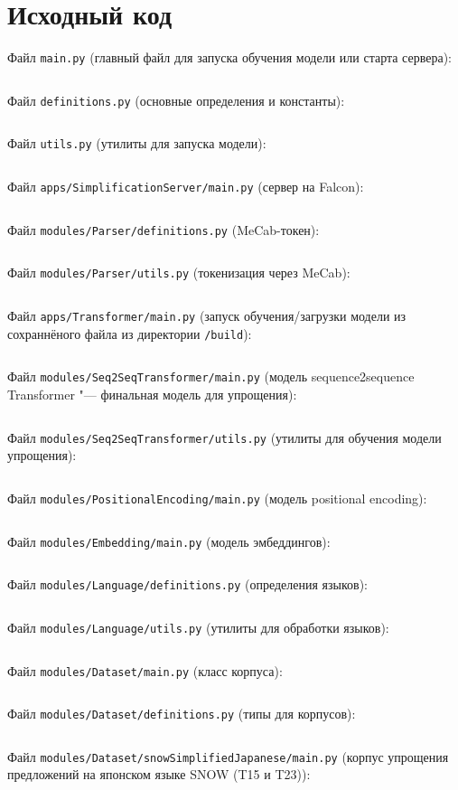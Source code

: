 \chapter{Исходный код}\label{appendix-code}							%

\newcommand{\sourceCodeFile}[2]{%
	Файл \texttt{#1} (#2):
	\inputminted[tabsize=2, mathescape, fontsize=\fontsize{10}{10}\selectfont]{python}{code/#1}%
}

\sourceCodeFile{main.py}{главный файл для запуска обучения модели или старта сервера}
\sourceCodeFile{definitions.py}{основные определения и константы}
\sourceCodeFile{utils.py}{утилиты для запуска модели}

\sourceCodeFile{apps/SimplificationServer/main.py}{сервер на Falcon}
\sourceCodeFile{modules/Parser/definitions.py}{MeCab-токен}
\sourceCodeFile{modules/Parser/utils.py}{токенизация через MeCab}

\sourceCodeFile{apps/Transformer/main.py}{запуск обучения/загрузки модели из сохраннёного файла из директории \texttt{/build}}

\sourceCodeFile{modules/Seq2SeqTransformer/main.py}{модель sequence2sequence Transformer "--- финальная модель для упрощения}
\sourceCodeFile{modules/Seq2SeqTransformer/utils.py}{утилиты для обучения модели упрощения}

\sourceCodeFile{modules/PositionalEncoding/main.py}{модель positional encoding}

\sourceCodeFile{modules/Embedding/main.py}{модель эмбеддингов}

\sourceCodeFile{modules/Language/definitions.py}{определения языков}
\sourceCodeFile{modules/Language/utils.py}{утилиты для обработки языков}

\sourceCodeFile{modules/Dataset/main.py}{класс корпуса}
\sourceCodeFile{modules/Dataset/definitions.py}{типы для корпусов}
\sourceCodeFile{modules/Dataset/snowSimplifiedJapanese/main.py}{корпус упрощения предложений на японском языке SNOW (T15 и T23)}




